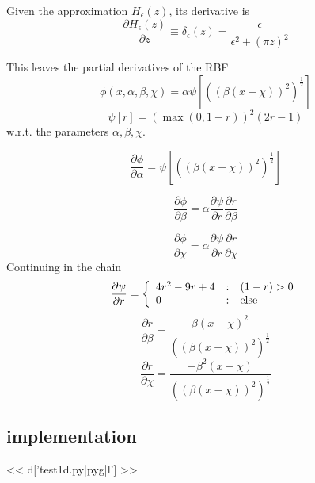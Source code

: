 \documentclass[]{article}
\begin{document}
\par
Given the approximation \(H_\epsilon(z)\), its derivative is
\begin{equation}
\frac{\partial H_\epsilon(z)}{\partial z} \equiv \delta_\epsilon(z) = 
\frac{\epsilon}{\epsilon^2 + (\pi z)^2}
\end{equation}
\par
This leaves the partial derivatives of the RBF 
\begin{equation}
\phi(x,\alpha,\beta,\chi) = \alpha \psi \left [
  ((\beta(x-\chi))^2)^{\frac{1}{2}} \right ]
\end{equation}
\begin{equation}
\psi[r] = \left ( \max{(0,1-r)} \right )^2(2r-1)
\end{equation}
w.r.t. the parameters \(\alpha, \beta, \chi\).

\begin{equation}
\frac{\partial \phi}{\partial \alpha} = \psi \left [ ((\beta(x-\chi))^2)^{\frac{1}{2}}\right ]
\end{equation}

\begin{equation}
\frac{\partial \phi}{\partial \beta} = \alpha \frac{\partial
  \psi}{\partial r} \frac{\partial r}{\partial \beta}
\end{equation}

\begin{equation}
\frac{\partial \phi}{\partial \chi} = \alpha \frac{\partial
  \psi}{\partial r} \frac{\partial r}{\partial \chi}
\end{equation}
Continuing in the chain
\begin{equation}
\frac{\partial \psi}{\partial r} = \left\{ 
\begin{array}{l@{\quad:\quad}l}
4r^2 - 9r + 4 & (1-r) > 0\\
0 & \mbox{else}
\end{array} \right.
\end{equation}
\begin{equation}
\frac{\partial r}{\partial \beta} = 
\frac{\beta(x-\chi)^2}{((\beta(x-\chi))^2)^{\frac{1}{2}}}
\end{equation}
\begin{equation}
\frac{\partial r}{\partial \chi} = 
\frac{-\beta^2(x-\chi)}{((\beta(x-\chi))^2)^{\frac{1}{2}}}
\end{equation}

\subsection{implementation}
<< d['test1d.py|pyg|l'] >>
\end{document}
